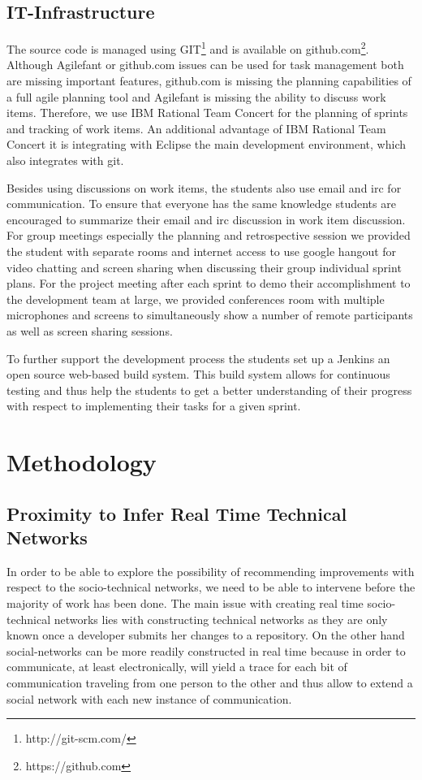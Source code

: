 \subsection{IT-Infrastructure}
The source code is managed using GIT\footnote{http://git-scm.com/} and is available on github.com\footnote{https://github.com}.
Although Agilefant or github.com issues can be used for task management both are missing important features, github.com is missing the planning capabilities of a full agile planning tool and Agilefant is missing the ability to discuss work items.
Therefore, we use IBM Rational Team Concert for the planning of sprints and tracking of work items.
An additional advantage of IBM Rational Team Concert it is integrating with Eclipse the main development environment, which also integrates with git. 

Besides using discussions on work items, the students also use email and irc for communication.
To ensure that everyone has the same knowledge students are encouraged to summarize their email and irc discussion in work item discussion.
For group meetings especially the planning and retrospective session we provided the student with separate rooms and internet access to use google hangout for video chatting and screen sharing when discussing their group individual sprint plans.
For the project meeting after each sprint to demo their accomplishment to the development team at large, we provided conferences room with multiple microphones and screens to simultaneously show a number of remote participants as well as screen sharing sessions. 

To further support the development process the students set up a Jenkins an open source web-based build system.
This build system allows for continuous testing and thus help the students to get a better understanding of their progress with respect to implementing their tasks for a given sprint.

\section{Methodology}
\subsection{Proximity to Infer Real Time Technical Networks}
\label{chap:making:subset:proximity}
In order to be able to explore the possibility of recommending improvements with respect to the socio-technical networks, we need to be able to intervene before the majority of work has been done.
The main issue with creating real time socio-technical networks lies with constructing technical networks as they are only known once a developer submits her changes to a repository.
On the other hand social-networks can be more readily constructed in real time because in order to communicate, at least electronically, will yield a trace for each bit of communication traveling from one person to the other and thus allow to extend a social network with each new instance of communication.

